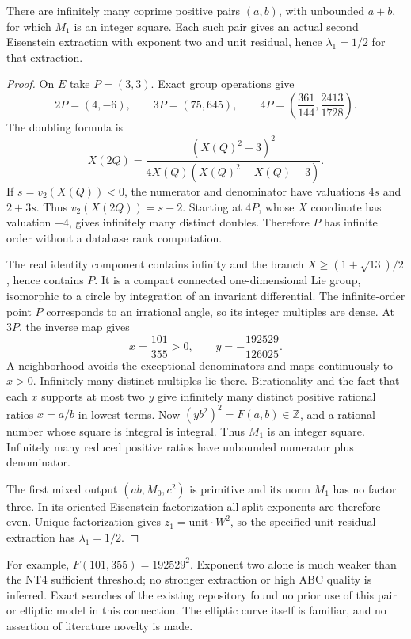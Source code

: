 \begin{theorem}
\label{qg-square-family}
There are infinitely many coprime positive pairs $(a,b)$, with unbounded
$a+b$, for which $M_1$ is an integer square. Each such pair gives an actual
second Eisenstein extraction with exponent two and unit residual, hence
$\lambda_1=1/2$ for that extraction.
\end{theorem}
\begin{proof}
On $E$ take $P=(3,3)$. Exact group operations give
\[
 2P=(4,-6),\qquad 3P=(75,645),\qquad
 4P=\left(\frac{361}{144},\frac{2413}{1728}\right).
\]
The doubling formula is
\begin{equation}\label{qg-doubling}
 X(2Q)=\frac{(X(Q)^2+3)^2}{4X(Q)(X(Q)^2-X(Q)-3)}.
\end{equation}
If $s=v_2(X(Q))<0$, the numerator and denominator have valuations $4s$
and $2+3s$. Thus $v_2(X(2Q))=s-2$. Starting at $4P$, whose $X$ coordinate
has valuation $-4$, gives infinitely many distinct doubles. Therefore $P$
has infinite order without a database rank computation.

The real identity component contains infinity and the branch
$X\ge(1+\sqrt{13})/2$, hence contains $P$. It is a compact connected
one-dimensional Lie group, isomorphic to a circle by integration of an
invariant differential. The infinite-order point $P$ corresponds to an
irrational angle, so its integer multiples are dense. At $3P$, the inverse
map gives
\[
 x=\frac{101}{355}>0,\qquad y=-\frac{192529}{126025}.
\]
A neighborhood avoids the exceptional denominators and maps continuously
to $x>0$. Infinitely many distinct multiples lie there. Birationality and
the fact that each $x$ supports at most two $y$ give infinitely many
distinct positive rational ratios $x=a/b$ in lowest terms.
Now $(yb^2)^2=F(a,b)\in\mathbb Z$, and a rational number whose square is
integral is integral. Thus $M_1$ is an integer square. Infinitely many
reduced positive ratios have unbounded numerator plus denominator.

The first mixed output $(ab,M_0,c^2)$ is primitive and its norm $M_1$ has
no factor three. In its oriented Eisenstein factorization all split
exponents are therefore even. Unique factorization gives
$z_1=\text{unit}\cdot W^2$, so the specified unit-residual extraction has
$\lambda_1=1/2$.
\end{proof}
For example, $F(101,355)=192529^2$. Exponent two alone is much weaker than
the NT4 sufficient threshold; no stronger extraction or high ABC quality
is inferred. Exact searches of the existing repository found no prior use
of this pair or elliptic model in this connection. The elliptic curve itself
is familiar, and no assertion of literature novelty is made.

